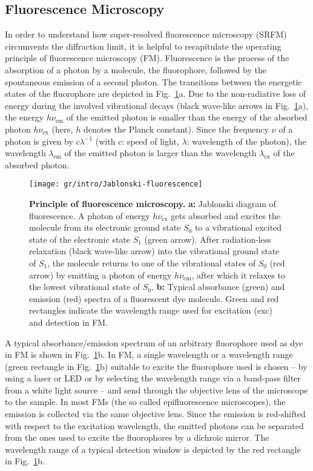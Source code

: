 
\subsection{Fluorescence Microscopy}
\label{sec:fm}
In order to understand how super-resolved fluorescence microscopy (SRFM)
circumvents the diffraction limit, it is helpful to recapitulate the operating
principle of fluorescence microscopy (FM). Fluorescence is the process of the
absorption of a photon by a molecule, the fluorophore, followed by the
spontaneous emission of a second photon. The transitions between the energetic
states of the fluorophore are depicted in
Fig.~\ref{fig:jablonski-fluorescence}a. Due to the non-radiative loss of
energy during the involved vibrational decays (black wave-like arrows in
Fig.~\ref{fig:jablonski-fluorescence}a), the energy $h\nu_\text{em}$ of the
emitted photon is smaller than the energy of the absorbed photon
$h\nu_\text{ex}$ (here, $h$ denotes the Planck constant). Since the frequency $\nu$
of a photon is given by $c\lambda^{-1}$ (with $c$: speed of light, $\lambda$:
wavelength of the photon), the wavelength $\lambda_\text{em}$ of the emitted
photon is larger than the wavelength $\lambda_\text{ex}$ of the absorbed
photon.      

\begin{figure}
  \centering
  \texttt{[image: gr/intro/Jablonski-fluorescence]}
  
  \caption{%
    \textbf{Principle of fluorescence microscopy.}  \textbf{a:} Jablonski
    diagram of fluorescence. A photon of energy $h\nu_\text{ex}$ gets absorbed
    and excites the molecule from its electronic ground state $S_0$ to a
    vibrational excited state of the electronic state $S_1$ (green
    arrow). After radiation-less relaxation (black wave-like arrow) into the
    vibrational 
    ground state of $S_1$, the molecule returns to one of the vibrational
    states of $S_0$ (red arrow) by emitting a photon of energy
    $h\nu_\text{em}$, after which it relaxes to the lowest vibrational state
    of $S_0$.  \textbf{b:} Typical absorbance (green) and emission (red)
    spectra of a fluorescent dye molecule. Green and red rectangles indicate
    the wavelength range used for excitation (exc) and detection in FM.  }
  \label{fig:jablonski-fluorescence}
\end{figure}

A typical absorbance/emission spectrum of an arbitrary fluorophore used as dye
in FM is shown in Fig.~\ref{fig:jablonski-fluorescence}b. In FM, a single
wavelength or a wavelength range (green rectangle in
Fig.~\ref{fig:jablonski-fluorescence}b) suitable to excite the fluorophore
used is chosen -- by using a laser or LED or by selecting the wavelength range
via a band-pass filter from a white light source -- and send through the
objective lens of the microscope to the sample. In most FMs (the so called
epifluorescence microscopes), the emission is collected via the same objective
lens. Since the emission is red-shifted with respect to the excitation
wavelength, the emitted photons can be separated from the ones used to
excite the fluorophores by a dichroic mirror. The wavelength range of a typical
detection window is depicted by the red rectangle in
Fig.~\ref{fig:jablonski-fluorescence}b. 

